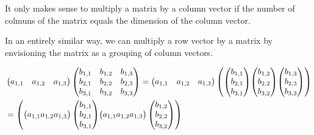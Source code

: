 \documentclass{ximera}
\begin{document}
\begin{warning}
  It only makes sense to multiply a matrix by a column vector if the
  number of colmuns of the matrix equals the dimension of the column
  vector.
\end{warning}


In an entirely similar way, we can multiply a row vector by a matrix
by envisioning the matrix as a grouping of column vectors.



\begin{align*}
&\begin{pmatrix} a_{1,1} & a_{1,2} & a_{1,3} \end{pmatrix}
\begin{pmatrix}
  b_{1,1} & b_{1,2} & b_{1,3} \\
  b_{2,1} & b_{2,2} & b_{2,3} \\
  b_{3,1} & b_{3,2} & b_{3,3}
\end{pmatrix}
=
\begin{pmatrix} a_{1,1} & a_{1,2} & a_{1,3} \end{pmatrix}\arraycolsep=0pt
\begin{pmatrix}
  \begin{pmatrix} b_{1,1} \\ b_{2,1} \\ b_{3,1} \end{pmatrix} &
  \begin{pmatrix} b_{1,2} \\ b_{2,2} \\ b_{3,2} \end{pmatrix} &
  \begin{pmatrix} b_{1,3} \\ b_{2,3} \\ b_{3,3} \end{pmatrix}
\end{pmatrix} \\
&=\arraycolsep=0pt
\begin{pmatrix}
  \begin{pmatrix} a_{1,1} & a_{1,2} & a_{1,3} \end{pmatrix}\begin{pmatrix} b_{1,1} \\ b_{2,1} \\ b_{3,1} \end{pmatrix} &
  \begin{pmatrix} a_{1,1} & a_{1,2} & a_{1,3} \end{pmatrix}\begin{pmatrix} b_{1,2} \\ b_{2,2} \\ b_{3,2} \end{pmatrix} &

\end{pmatrix}
\end{align*}
\end{document}
